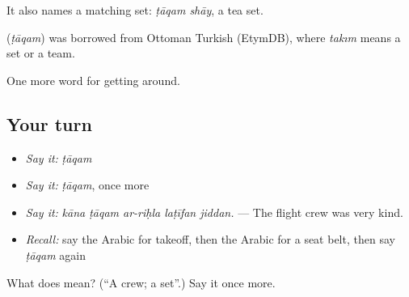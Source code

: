 It also names a matching set: \emph{ṭāqam shāy}, a tea set.

\begin{cousinweb}
\textbf{} (\emph{ṭāqam}) was borrowed from Ottoman Turkish (EtymDB), where \emph{takım} means a set or a team.
\end{cousinweb}

\begin{grammarlens}[title={What you've built}]
One more word for getting around.
\end{grammarlens}

\subsection*{Your turn}
\begin{itemize}
\raggedright
  \item \emph{Say it:} \emph{ṭāqam}
  \item \emph{Say it:} \emph{ṭāqam}, once more
  \item \emph{Say it:} \emph{kāna ṭāqam ar-riḥla laṭīfan jiddan.} — The flight crew was very kind.
  \item \emph{Recall:} say the Arabic for takeoff, then the Arabic for a seat belt, then say \emph{ṭāqam} again
\end{itemize}

\begin{tcolorbox}[breakable,colback=teal!4,colframe=teal!35!black,title={Before you move on}]
What does  mean? (\textquotedblleft{}A crew; a set\textquotedblright{}.) Say it once more.
\end{tcolorbox}
